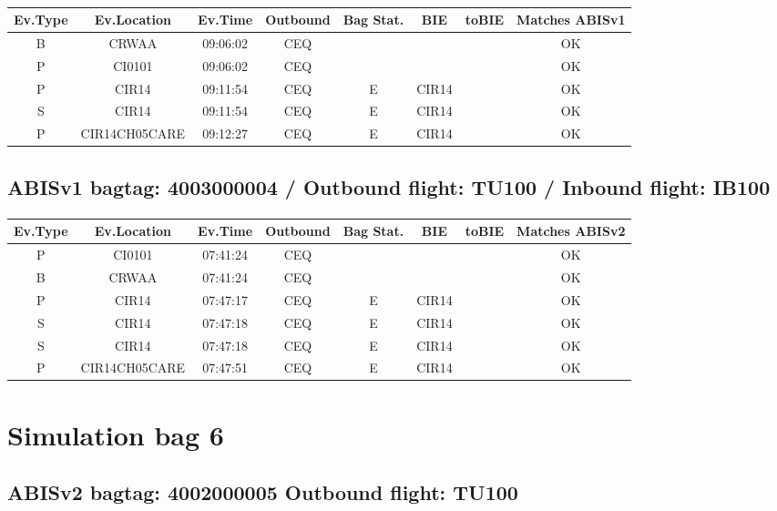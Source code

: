 \documentclass{report}
\begin{document}
\paragraph{}
\begin{longtable}{cccccccc}    \toprule
\rowcolor{white!50}
\textbf{Ev.Type} & \textbf{Ev.Location} & \textbf{Ev.Time} & \textbf{Outbound} & \textbf{Bag Stat.} & \textbf{BIE} & \textbf{toBIE} & \textbf{Matches ABISv1} \\\midrule
B & CRWAA & 09:06:02  & CEQ &  &  &  & OK\\
P & CI0101 & 09:06:02  & CEQ &  &  &  & OK\\
P & CIR14 & 09:11:54  & CEQ & E & CIR14 &  & OK\\
S & CIR14 & 09:11:54  & CEQ & E & CIR14 &  & OK\\
P & CIR14CH05CARE & 09:12:27  & CEQ & E & CIR14 &  & OK\\
\bottomrule
\end{longtable}
\subsection*{ABISv1 bagtag: 4003000004 / Outbound flight: TU100 / Inbound flight: IB100}
\paragraph{}
\begin{longtable}{cccccccc}    \toprule
\rowcolor{white!50}
\textbf{Ev.Type} & \textbf{Ev.Location} & \textbf{Ev.Time} & \textbf{Outbound} & \textbf{Bag Stat.} & \textbf{BIE} & \textbf{toBIE} & \textbf{Matches ABISv2} \\\midrule
P & CI0101 & 07:41:24  & CEQ &  &  &  & OK\\
B & CRWAA & 07:41:24  & CEQ &  &  &  & OK\\
P & CIR14 & 07:47:17  & CEQ & E & CIR14 &  & OK\\
S & CIR14 & 07:47:18  & CEQ & E & CIR14 &  & OK\\
S & CIR14 & 07:47:18  & CEQ & E & CIR14 &  & OK\\
P & CIR14CH05CARE & 07:47:51  & CEQ & E & CIR14 &  & OK\\
\bottomrule
\end{longtable}
\pagebreak
\section*{Simulation bag 6}
\subsection*{ABISv2 bagtag: 4002000005 Outbound flight: TU100}
\end{document}
